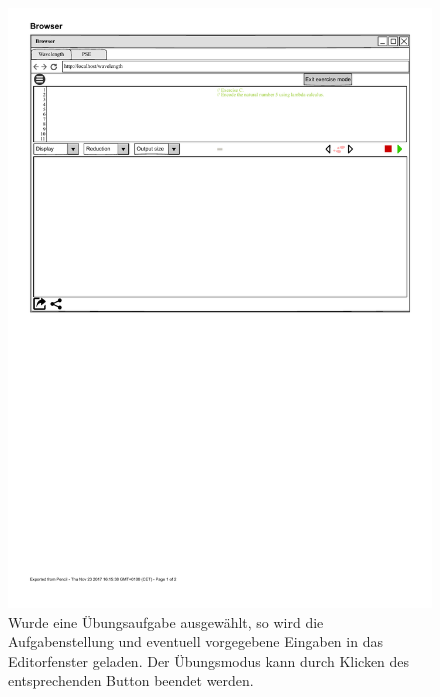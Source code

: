 \documentclass[parskip=full,11pt,twoside]{scrartcl}
\begin{document}
\begin{figure}[H]
	\centering
	\includegraphics[width=\textwidth]{img/wavelength_exerciseMode}
	\caption{Wurde eine Übungsaufgabe ausgewählt, so wird die Aufgabenstellung und eventuell vorgegebene Eingaben in das Editorfenster geladen. Der Übungsmodus kann durch Klicken des entsprechenden Button beendet werden.}
\end{figure}
\end{document}
